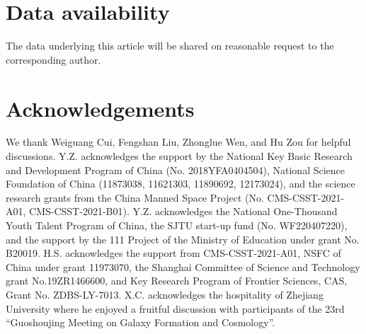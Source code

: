 \documentclass[fleqn,usenatbib]{mnras}
\begin{document}
\section*{Data availability}

The data underlying this article will be shared on reasonable request to the corresponding author.


\section*{Acknowledgements}

We thank Weiguang Cui, Fengshan Liu, Zhonglue Wen, and Hu Zou for helpful
discussions. Y.Z. acknowledges the support by the National Key Basic
Research and Development Program of China (No. 2018YFA0404504), National
Science Foundation of China (11873038, 11621303, 11890692, 12173024), and
the science research grants from the China Manned Space Project (No.
CMS-CSST-2021-A01, CMS-CSST-2021-B01). Y.Z. acknowledges the National
One-Thousand Youth Talent Program of China, the SJTU start-up fund (No.
WF220407220), and the support by the 111 Project of the Ministry of
Education under grant No. B20019.  H.S. acknowledges the support from
CMS-CSST-2021-A01, NSFC of China under grant 11973070, the Shanghai
Committee of Science and Technology grant No.19ZR1466600, and Key Research
Program of Frontier Sciences, CAS, Grant No. ZDBS-LY-7013.  X.C.
acknowledges the hospitality of Zhejiang University where he enjoyed a
fruitful discussion with participants of the 23rd ``Guoshoujing Meeting on
Galaxy Formation and Cosmology''.






% 

\end{document}
